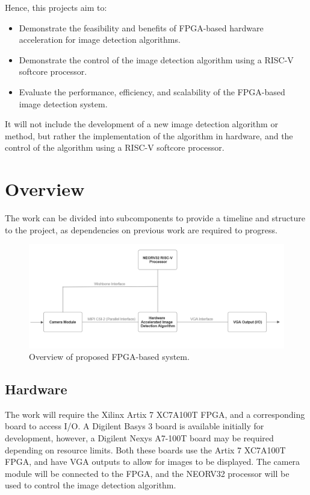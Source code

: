 Hence, this projects aim to:
\begin{itemize}
    \item Demonstrate the feasibility and benefits of FPGA-based hardware acceleration for image detection algorithms.
    \item Demonstrate the control of the image detection algorithm using a RISC-V softcore processor.
    \item Evaluate the performance, efficiency, and scalability of the FPGA-based image detection system.
\end{itemize}

It will not include the development of a new image detection algorithm or method, but rather the implementation of the algorithm in hardware, and the control of the algorithm using a RISC-V softcore processor.

\section{Overview}
The work can be divided into subcomponents to provide a timeline and structure to the project, as dependencies on previous work are required to progress.

\begin{figure}[h]
    \centering
    \includegraphics[width=1\textwidth]{Assets/Overview.png}
    \caption{Overview of proposed FPGA-based system.}
    \label{fig:overview}
\end{figure}

\subsection{Hardware}
The work will require the Xilinx Artix 7 XC7A100T FPGA, and a corresponding board to access I/O.
A Digilent Basys 3 board is available initially for development, however, a Digilent Nexys A7-100T board may be required depending on resource limits.
Both these boards use the Artix 7 XC7A100T FPGA, and have VGA outputs to allow for images to be displayed.
The camera module will be connected to the FPGA, and the NEORV32 processor will be used to control the image detection algorithm.

